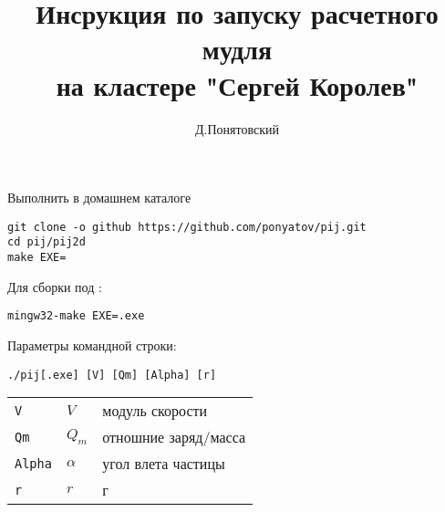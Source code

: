 






\title{Инсрукция по запуску расчетного мудля\\на кластере "Сергей Королев"}
\author{Д.Понятовский }

\maketitle
\tableofcontents

\secdown


Выполнить в домашнем каталоге

\begin{verbatim}
git clone -o github https://github.com/ponyatov/pij.git
cd pij/pij2d
make EXE=
\end{verbatim}

Для сборки под \win{}:

\begin{verbatim}
mingw32-make EXE=.exe
\end{verbatim}




Параметры командной строки:

\begin{verbatim}
./pij[.exe] [V] [Qm] [Alpha] [r]
\end{verbatim}

\begin{tabular}{l l l}
	\verb|V| & $V$ & модуль скорости \\
	\verb|Qm| & $Q_m$ & отношние заряд/масса \\
	\verb|Alpha| & $\alpha$ & угол влета частицы \\
	\verb|r| & $r$ & г \\
\end{tabular}

\secdown









\secup


